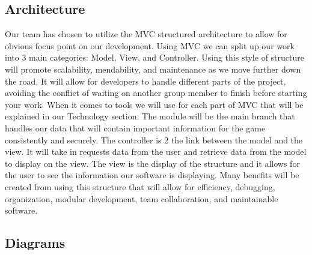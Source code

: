 \documentclass{article}
\begin{document}
\subsection{Architecture}

Our team has chosen to utilize the MVC structured architecture to allow for obvious focus point on our development. Using MVC we can split up our work into 3 main categories: Model, View, and Controller. Using this style of structure will promote scalability, mendability, and maintenance as we move further down the road. It will allow for developers to handle different parts of the project, avoiding the conflict of waiting on another group member to finish before starting your work. When it comes to tools we will use for each part of MVC that will be explained in our Technology section. The module will be the main branch that handles our data that will contain important information for the game consistently and securely. The controller is 2 the link between the model and the view. It will take in requests data from the user and retrieve data from the model to display on the view. The view is the display of the structure and it allows for the user to see the information our software is displaying. Many benefits will be created from using this structure that will allow for efficiency, debugging, organization, modular development, team collaboration, and maintainable software.

\subsection{Diagrams}
\end{document}
